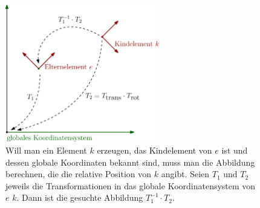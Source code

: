 \begin{figure}
 \centering
 \includegraphics[width=0.6\textwidth]{graphics/transformation_matrices_spine.eps}
 \caption{Will man ein Element $k$ erzeugen, das Kindelement von $e$ ist und dessen globale Koordinaten bekannt sind, muss man die Abbildung berechnen, die die relative Position von $k$ angibt. Seien $T_1$ und $T_2$ jeweils die Transformationen in das globale Koordinatensystem von $e$ \bzw $k$. Dann ist die gesuchte Abbildung $T_1^{-1} \cdot T_2$.}
\end{figure}





